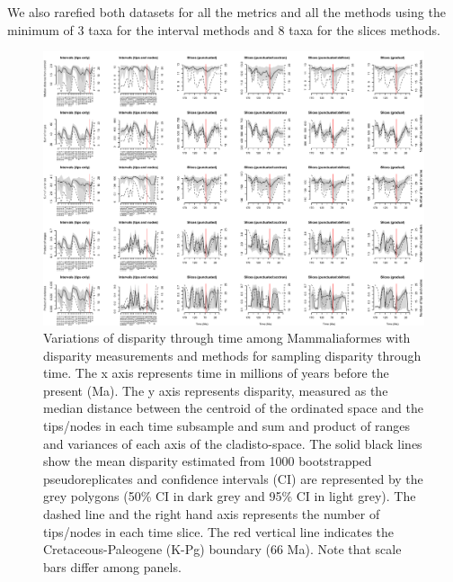 We also rarefied both datasets for all the metrics and all the methods using the minimum of 3 taxa for the interval methods and 8 taxa for the slices methods.

\begin{landscape}
\begin{figure}[!htbp]
\centering
    \includegraphics[width=\textwidth,height=\textheight,keepaspectratio]{Supplementaries/Figures/STD/Mammaliaformes_all_methods.pdf}
\caption[Comparison of all the disparity metrics and all the time series methods for Mammaliaformes]{Variations of disparity through time among Mammaliaformes with disparity measurements and methods for sampling disparity through time. The x axis represents time in millions of years before the present (Ma). The y axis represents disparity, measured as the median distance between the centroid of the ordinated space and the tips/nodes in each time subsample and sum and product of ranges and variances of each axis of the cladisto-space. The solid black lines show the mean disparity estimated from 1000 bootstrapped pseudoreplicates and confidence intervals (CI) are represented by the grey polygons (50\% CI in dark grey and 95\% CI in light grey). The dashed line and the right hand axis represents the number of tips/nodes in each time slice. The red vertical line indicates the Cretaceous-Paleogene (K-Pg) boundary (66 Ma). Note that scale bars differ among panels.}
\label{Supp_disparity_all_Mammaliaformes}
\end{figure}
\end{landscape}

